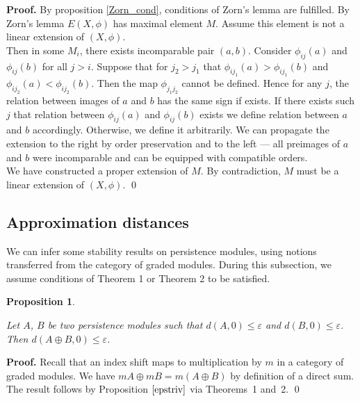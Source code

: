 \documentclass[english,12pt]{article}
\newcounter{stmcounter}[section]
\numberwithin{equation}{section}
\newtheorem{proposition}[stmcounter]{Proposition}
\theoremstyle{definition}
\theoremstyle{remark}
\newenvironment{pf}{\noindent\textbf{Proof.}}{\qed}
\renewcommand{\leq}{\leqslant}
\begin{document}
\begin{pf}
  By proposition \ref{Zorn_cond}, conditions of Zorn's lemma are fulfilled. By Zorn's lemma $E(X,\phi)$ has maximal element $M$. Assume this element is not a linear extension of $(X,\phi)$.\\

  Then in some $M_i$, there exists incomparable pair $(a,b)$. Consider $\phi_{ij}(a)$ and $\phi_{ij}(b)$ for all $j > i$. Suppose that for $j_2 > j_1$ that $\phi_{ij_1}(a) > \phi_{ij_1}(b)$ and $\phi_{ij_2}(a) < \phi_{ij_2}(b)$. Then the map $\phi_{j_1j_2}$ cannot be defined. Hence for any $j$, the relation between images of $a$ and $b$ has the same sign if exists. If there exists such $j$ that relation between $\phi_{ij}(a)$ and $\phi_{ij}(b)$ exists we define relation between $a$ and $b$ accordingly. Otherwise, we define it arbitrarily. We can propagate the extension to the right by order preservation and to the left --- all preimages of $a$ and $b$ were incomparable and can be equipped with compatible orders.\\

  We have constructed a proper extension of $M$. By contradiction, $M$ must be a linear extension of $(X,\phi)$.
\end{pf}

\subsection{Approximation distances}

We can infer some stability results on persistence modules, using notions transferred from the category of graded modules. During this subsection, we assume conditions of Theorem 1 or Theorem 2 to be satisfied.\\

\begin{proposition} ~ \par
  \label{prop:sum}
  Let $A$, $B$ be two persistence modules such that $d(A,0) \leq \varepsilon$ and $d(B,0) \leq \varepsilon$. Then $d(A \oplus B,0) \leq \varepsilon$.
\end{proposition}

\begin{pf}
  Recall that an index shift maps to multiplication by $m$ in a category of graded modules. We have $mA \oplus mB = m(A \oplus B)$ by definition of a direct sum. The result follows by Proposition $\ref{epstriv}$ via Theorems~1 and~2.
\end{pf}
\end{document}
